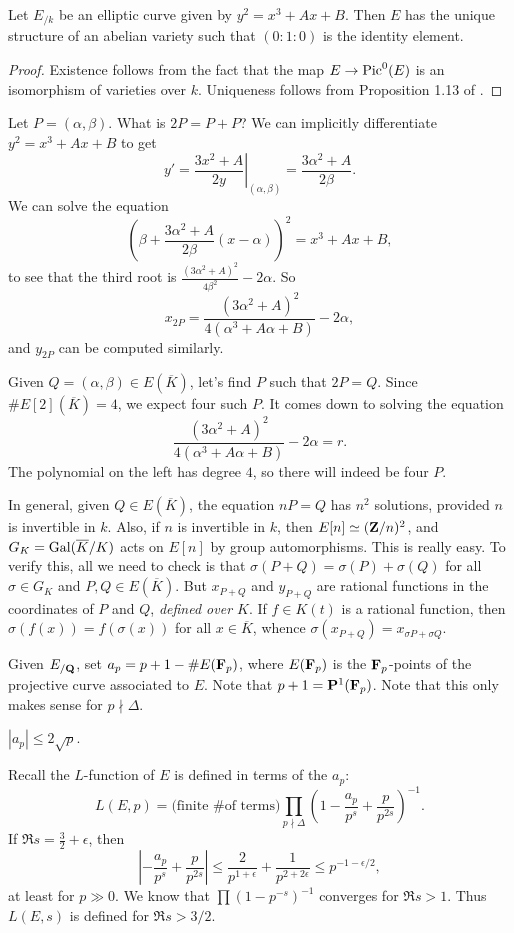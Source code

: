 \begin{theorem}
Let $E_{/k}$ be an elliptic curve given by $y^2=x^3+A x+B$. Then $E$ has the 
unique structure of an abelian variety such that $(0:1:0)$ is the identity 
element. 
\end{theorem}
\begin{proof}
Existence follows from the fact that the map $E\to \operatorname{Pic}^0(E)$ is an 
isomorphism of varieties over $k$. Uniqueness follows from Proposition 1.13 of 
\cite{moonenABV}. 
\end{proof}

Let $P=(\alpha,\beta)$. What is $2 P=P+P$? We can implicitly differentiate 
$y^2=x^3+A x+B$ to get 
\[
  y' = \left.\frac{3 x^2+A}{2 y}\right|_{(\alpha,\beta)} = \frac{3\alpha^2+A}{2 \beta} .
\]
We can solve the equation 
\[
  \left(\beta+\frac{3\alpha^2+A}{2\beta}(x-\alpha)\right)^2 = x^3+A x+B ,
\]
to see that the third root is $\frac{(3\alpha^2+A)^2}{4\beta^2} - 2\alpha$. So 
\[
  x_{2 P} = \frac{(3\alpha^2+A)^2}{4(\alpha^3+A\alpha+B)} - 2\alpha ,
\]
and $y_{2 P}$ can be computed similarly. 

Given $Q=(\alpha,\beta)\in E(\overline K)$, let's find $P$ such that 
$2 P=Q$. Since $\# E[2](\overline K)=4$, we expect four such $P$. It comes down 
to solving the equation 
\[
  \frac{(3\alpha^2+A)^2}{4(\alpha^3+A\alpha+B)} - 2\alpha = r .
\]
The polynomial on the left has degree $4$, so there will indeed be four $P$. 

In general, given $Q\in E(\overline K)$, the equation $n P=Q$ has $n^2$ 
solutions, provided $n$ is invertible in $k$. Also, if $n$ is invertible in 
$k$, then $E[n]\simeq (\mathbf{Z}/n)^2$, and $G_K=\operatorname{Gal}(\overline K/K)$ acts on 
$E[n]$ by group automorphisms. This is really easy. To verify this, all we need 
to check is that $\sigma(P+Q)=\sigma(P)+\sigma(Q)$ for all $\sigma\in G_K$ and 
$P,Q\in E(\overline K)$. But $x_{P+Q}$ and $y_{P+Q}$ are rational functions in 
the coordinates of $P$ and $Q$, \emph{defined over $K$}. If 
$f\in K(t)$ is a rational function, then $\sigma(f(x))=f(\sigma(x))$ for all 
$x\in \overline K$, whence $\sigma(x_{P+Q})=x_{\sigma P+\sigma Q}$. 

Given $E_{/\mathbf{Q}}$, set $a_p=p+1-\# E(\mathbf{F}_p)$, where $E(\mathbf{F}_p)$ is the 
$\mathbf{F}_p$-points of the projective curve associated to $E$. Note that 
$p+1=\mathbf{P}^1(\mathbf{F}_p)$. Note that this only makes sense for $p\nmid \Delta$. 

\begin{theorem}[Hasse]
$|a_p|\leqslant 2\sqrt p$. 
\end{theorem}
Recall the $L$-function of $E$ is defined in terms of the $a_p$: 
\[
  L(E,p) = \text{(finite \# of terms)} \prod_{p\nmid \Delta} \left(1-\frac{a_p}{p^s} + \frac{p}{p^{2s}}\right)^{-1} .
\]
If $\Re s=\frac 3 2+\epsilon$, then 
\[
  \left|-\frac{a_p}{p^s} + \frac{p}{p^{2s}}\right| \leqslant \frac{2}{p^{1+\epsilon}}+\frac{1}{p^{2+2\epsilon}} \leqslant p^{-1-\epsilon/2} ,
\]
at least for $p\gg 0$. We know that $\prod (1-p^{-s})^{-1}$ converges for 
$\Re s>1$. Thus $L(E,s)$ is defined for $\Re s>3/2$. 

